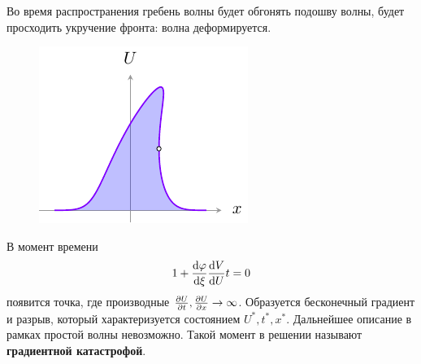 Во время распространения гребень волны будет обгонять подошву волны, будет просходить укручение фронта: волна деформируется.
\begin{figure}[H]
	\centering
	\includegraphics[scale=1.4]{img/diffusion_instability/ux2.pdf}
\end{figure}
В момент времени
\begin{equation}
	1+\dv{\varphi}{\xi}\dv{V}{U} t = 0
\end{equation}
появится точка, где производные $\pdv{U}{t}, \pdv{U}{x} \rightarrow \infty $. Образуется бесконечный градиент и разрыв, который характеризуется состоянием $U^*, t^*, x^*$. Дальнейшее описание в рамках простой волны невозможно. Такой момент в решении называют \textbf{градиентной катастрофой}. %